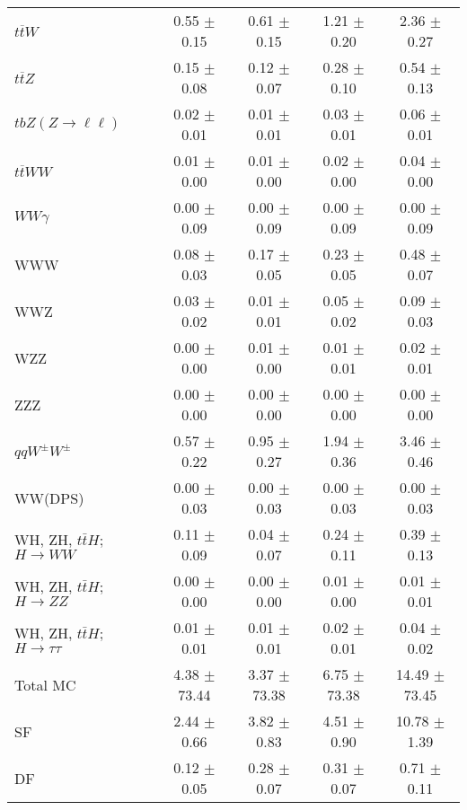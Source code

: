 \begin{tabular}{l|cccc}
                   $t\overline{t}W$ &  0.55 $\pm$  0.15 &  0.61 $\pm$  0.15 &  1.21 $\pm$  0.20 &  2.36 $\pm$  0.27 \\
                   $t\overline{t}Z$ &  0.15 $\pm$  0.08 &  0.12 $\pm$  0.07 &  0.28 $\pm$  0.10 &  0.54 $\pm$  0.13 \\
    $tbZ (Z \rightarrow \ell \ell)$ &  0.02 $\pm$  0.01 &  0.01 $\pm$  0.01 &  0.03 $\pm$  0.01 &  0.06 $\pm$  0.01 \\
                  $t\overline{t}WW$ &  0.01 $\pm$  0.00 &  0.01 $\pm$  0.00 &  0.02 $\pm$  0.00 &  0.04 $\pm$  0.00 \\
                         $WW\gamma$ &  0.00 $\pm$  0.09 &  0.00 $\pm$  0.09 &  0.00 $\pm$  0.09 &  0.00 $\pm$  0.09 \\
                                WWW &  0.08 $\pm$  0.03 &  0.17 $\pm$  0.05 &  0.23 $\pm$  0.05 &  0.48 $\pm$  0.07 \\
                                WWZ &  0.03 $\pm$  0.02 &  0.01 $\pm$  0.01 &  0.05 $\pm$  0.02 &  0.09 $\pm$  0.03 \\
                                WZZ &  0.00 $\pm$  0.00 &  0.01 $\pm$  0.00 &  0.01 $\pm$  0.01 &  0.02 $\pm$  0.01 \\
                                ZZZ &  0.00 $\pm$  0.00 &  0.00 $\pm$  0.00 &  0.00 $\pm$  0.00 &  0.00 $\pm$  0.00 \\
                 $qqW^{\pm}W^{\pm}$ &  0.57 $\pm$  0.22 &  0.95 $\pm$  0.27 &  1.94 $\pm$  0.36 &  3.46 $\pm$  0.46 \\
                            WW(DPS) &  0.00 $\pm$  0.03 &  0.00 $\pm$  0.03 &  0.00 $\pm$  0.03 &  0.00 $\pm$  0.03 \\
WH, ZH, $t\bar{t}H$; $H \rightarrow WW$ &  0.11 $\pm$  0.09 &  0.04 $\pm$  0.07 &  0.24 $\pm$  0.11 &  0.39 $\pm$  0.13 \\
WH, ZH, $t\bar{t}H$; $H \rightarrow ZZ$ &  0.00 $\pm$  0.00 &  0.00 $\pm$  0.00 &  0.01 $\pm$  0.00 &  0.01 $\pm$  0.01 \\
WH, ZH, $t\bar{t}H$; $H \rightarrow \tau\tau$ &  0.01 $\pm$  0.01 &  0.01 $\pm$  0.01 &  0.02 $\pm$  0.01 &  0.04 $\pm$  0.02 \\
\hline\hline
                           Total MC &  4.38 $\pm$ 73.44 &  3.37 $\pm$ 73.38 &  6.75 $\pm$ 73.38 & 14.49 $\pm$ 73.45 \\
\hline
                                 SF &  2.44 $\pm$  0.66 &  3.82 $\pm$  0.83 &  4.51 $\pm$  0.90 & 10.78 $\pm$  1.39 \\
                                 DF &  0.12 $\pm$  0.05 &  0.28 $\pm$  0.07 &  0.31 $\pm$  0.07 &  0.71 $\pm$  0.11 \\

\end{tabular}
